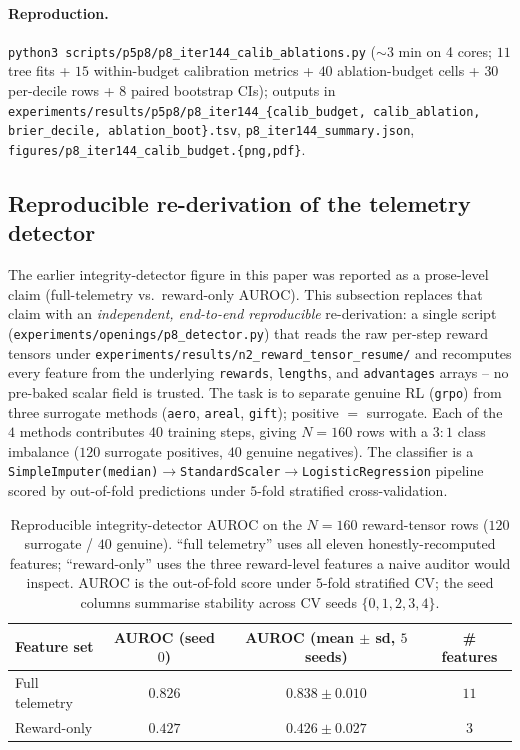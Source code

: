 \documentclass{article}
\begin{document}
\paragraph{Reproduction.}
\texttt{python3 scripts/p5p8/p8\_iter144\_calib\_ablations.py}
(${\sim}3$ min on 4 cores; $11$ tree fits + $15$ within-budget
calibration metrics + $40$ ablation-budget cells + $30$ per-decile
rows + $8$ paired bootstrap CIs); outputs in
\texttt{experiments/results/p5p8/p8\_iter144\_\{calib\_budget,
calib\_ablation, brier\_decile, ablation\_boot\}.tsv},
\texttt{p8\_iter144\_summary.json},
\texttt{figures/p8\_iter144\_calib\_budget.\{png,pdf\}}.
 \subsection{Reproducible re-derivation of the telemetry detector}
\label{sec:p8-reproducible-detector}

The earlier integrity-detector figure in this paper was reported as a
prose-level claim (full-telemetry vs.\ reward-only AUROC). This
subsection replaces that claim with an \emph{independent, end-to-end
reproducible} re-derivation: a single script
(\texttt{experiments/openings/p8\_detector.py}) that reads the raw
per-step reward tensors under
\texttt{experiments/results/n2\_reward\_tensor\_resume/} and recomputes
every feature from the underlying \texttt{rewards}, \texttt{lengths},
and \texttt{advantages} arrays -- no pre-baked scalar field is trusted.
The task is to separate genuine RL (\texttt{grpo}) from three surrogate
methods (\texttt{aero}, \texttt{areal}, \texttt{gift}); positive
$=$ surrogate. Each of the $4$ methods contributes $40$ training steps,
giving $N{=}160$ rows with a $3{:}1$ class imbalance ($120$ surrogate
positives, $40$ genuine negatives). The classifier is a
\texttt{SimpleImputer(median)}$\to$\texttt{StandardScaler}$\to$\texttt{LogisticRegression} pipeline scored by out-of-fold predictions
under $5$-fold stratified cross-validation.

\begin{table}[t]
\centering
\small
\caption{Reproducible integrity-detector AUROC on the $N{=}160$
reward-tensor rows ($120$ surrogate / $40$ genuine). ``full telemetry''
uses all eleven honestly-recomputed features; ``reward-only'' uses the
three reward-level features a naive auditor would inspect. AUROC is the
out-of-fold score under $5$-fold stratified CV; the seed columns
summarise stability across CV seeds $\{0,1,2,3,4\}$.}
\label{tab:p8-reproducible-detector}
\begin{tabular}{lccc}
\toprule
Feature set & AUROC (seed $0$) & AUROC (mean $\pm$ sd, $5$ seeds) & \# features \\
\midrule
Full telemetry & $0.826$ & $0.838 \pm 0.010$ & $11$ \\
Reward-only    & $0.427$ & $0.426 \pm 0.027$ & $3$ \\
\bottomrule
\end{tabular}
\end{table}
\end{document}
